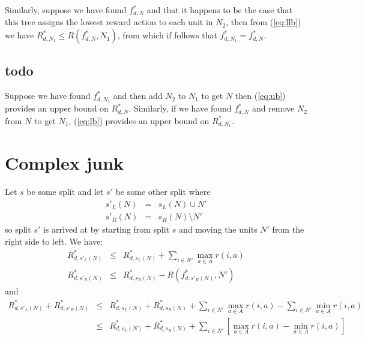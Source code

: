 \documentclass{article}
\begin{document}
Similarly, suppose we have found $f^{*}_{d,N}$ and that
it happens to be the case that this tree assigns the lowest reward
action to each unit in $N_2$, then from (\ref{eq:llb}) we have $R^{*}_{d,N_{1}}
\leq R(f^{*}_{d,N},N_{1})$, from which if follows that $f^{*}_{d,N_{1}} = f^{*}_{d,N}$.


\subsection{todo}
\label{sec:todo}



Suppose we have found $f^{*}_{d,N_{1}}$
and then add $N_2$ to $N_{1}$ to get $N$ then (\ref{eq:ub}) provides
an upper bound on $R^{*}_{d,N}$. Similarly, if we have found
$f^{*}_{d,N}$ and remove $N_2$ from $N$ to get $N_1$, (\ref{eq:lb})
provides an upper bound on $R^{*}_{d,N_{1}}$.


\section{Complex junk}
\label{sec:junk}


Let $s$ be some split and let $s'$ be some other split where
\begin{eqnarray}
  \label{eq:splits}
  s'_{L}(N) & = & s_{L}(N) \dot\cup N' \\
  s'_{R}(N) & = & s_{R}(N) \setminus N' 
\end{eqnarray}
so split $s'$ is arrived at by starting from split $s$ and moving the
units $N'$ from the right side to left.
We have:
\begin{eqnarray}
  \label{eq:splitsub}
  R^{*}_{d,s'_{L}(N)} & \leq & R^{*}_{d,s_{L}(N)} +  \sum_{i \in N'}
                               \max_{a \in A} r(i,a) \\
  R^{*}_{d,s'_{R}(N)} & \leq & R^{*}_{d,s_{R}(N)} -  R(f^{*}_{d,s'_{R}(N)},N')
\end{eqnarray}
and
\begin{eqnarray*}
  \label{eq:sumub}
  R^{*}_{d,s'_{L}(N)} +  R^{*}_{d,s'_{R}(N)}
  & \leq
  &  R^{*}_{d,s_{L}(N)}
    +  R^{*}_{d,s_{R}(N)}
    +  \sum_{i \in N'} \max_{a \in A} r(i,a)
    -  \sum_{i \in N'} \min_{a \in A} r(i,a) \\
  & \leq
  & R^{*}_{d,s_{L}(N)}
    +  R^{*}_{d,s_{R}(N)}
    +  \sum_{i \in N'} \left[ \max_{a \in A} r(i,a)- \min_{a \in A}
    r(i,a) \right]
\end{eqnarray*}


\end{document}
